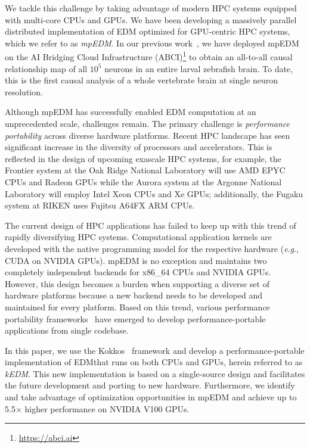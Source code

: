 \documentclass{acmart}
\begin{document}
We tackle this challenge by taking advantage of modern HPC systems equipped
with multi-core CPUs and GPUs. We have been developing a massively
parallel distributed implementation of EDM optimized for GPU-centric HPC
systems, which we refer to as \textit{mpEDM}. In our previous work~\cite{mpedm}, we have deployed mpEDM on the AI
Bridging Cloud Infrastructure (ABCI)\footnote{\url{https://abci.ai}} to
obtain an all-to-all causal relationship map of all $10^5$ neurons in an
entire larval zebrafish brain. To date, this is the first causal analysis
of a whole vertebrate brain at single neuron resolution.

Although mpEDM has successfully enabled EDM computation at an unprecedented
scale, challenges remain. The primary challenge is
\textit{performance portability} across diverse hardware platforms. Recent HPC
landscape has seen significant increase in the diversity of processors and
accelerators. This is reflected in the design of upcoming exascale HPC systems, for example, 
the Frontier system at the Oak Ridge National Laboratory will use AMD EPYC
CPUs and Radeon GPUs while the Aurora system at the Argonne National
Laboratory will employ Intel Xeon CPUs and Xe GPUs; additionally, the Fugaku system at RIKEN
uses Fujitsu A64FX ARM CPUs.

The current design of HPC applications has failed to keep up with this trend
of rapidly diversifying HPC systems. Computational application kernels are developed with the native programming model for the
respective hardware (\textit{e}.\textit{g}., CUDA on NVIDIA GPUs). mpEDM is no exception and
maintains two completely independent backends for x86\_64 CPUs and NVIDIA
GPUs. However, this design becomes a burden when supporting a diverse set of
hardware platforms because a new backend needs to be developed and maintained
for every platform. Based on this trend, various performance portability
frameworks~\cite{Deakin2019, Deakin2020} have emerged to develop
performance-portable applications from single codebase.

In this paper, we use the Kokkos~\cite{Edwards2014} framework and develop a performance-portable implementation of EDM\@ that runs on
both CPUs and GPUs, herein referred to as \textit{kEDM}. This new implementation is based on a single-source design and
facilitates the future development and porting to new hardware. Furthermore,
we identify and take advantage of optimization opportunities in mpEDM and
achieve up to 5.5$\times$ higher performance on NVIDIA V100 GPUs.
\end{document}
